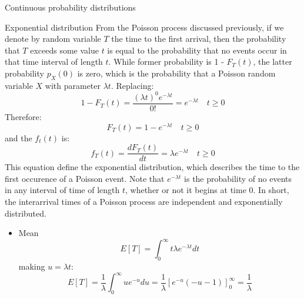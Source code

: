 \documentclass[8pt]{beamer}
\renewcommand{\emph}[1]{\textcolor{myorange}{#1}}
\begin{document}
\begin{frame}{Continuous probability distributions}
    \begin{block}{\alert{Exponential} distribution}
        From the \alert{Poisson process} discussed previously, if we denote by random variable $T$ the time to the first arrival, then the probability that $T$ exceeds some value $t$ is equal to the probability that no events occur in that time interval of length $t$. While former probability is 1 - $F_T (t)$, the latter probability $p_X (0)$ is zero, which is the probability that a Poisson random variable $X$ with parameter $\lambda t$. Replacing:
        \[
            1- F_T (t) = \frac{(\lambda t)^0 e^{-\lambda t}}{0!} = e^{-\lambda t} \quad t\geq 0
        \]
        Therefore:
        \[
            F_T (t) = 1 - e^{-\lambda t} \quad t\geq 0
        \]
        and the $f_t (t)$ is:
        \[
            f_T (t) = \frac{d F_T (t) }{dt} = \lambda e^{-\lambda t} \quad t\geq 0
        \]
        This equation define the \alert{exponential distribution}, which describes the time to the first occurence of a Poisson event. Note that $e^{-\lambda t}$ is the probability of no events in any interval of time of length $t$, whether or not it begins at time 0. In short, the interarrival times of a \alert{Poisson process} are independent and exponentially distributed. 
        \begin{itemize}
            \item \emph{Mean}
                \vspace{-5pt}
                \[
                    E[T] = \int_0^\infty t \lambda e^{-\lambda t} dt
                \]
                \vspace{-5pt}
                making $u=\lambda t$:
                \vspace{-5pt}
                \[
                    E[T] = \frac{1}{\lambda} \int_0^\infty u e^{-u} du = \frac{1}{\lambda} \left[ e^{-u} (-u-1) \right]_0^\infty = \frac{1}{\lambda}
                \]
        \end{itemize}
    \end{block}
\end{frame}
\end{document}
